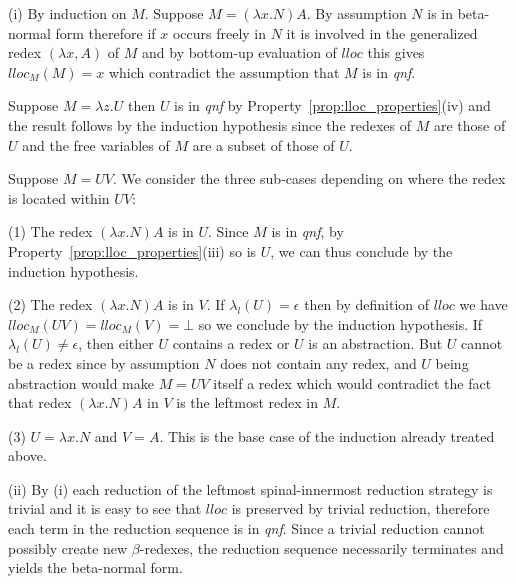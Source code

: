 \documentclass{elsarticle}
\theoremstyle{plain}
\theoremstyle{definition}
\theoremstyle{remark}
\begin{document}
\begin{compactitem}

\item[(i)]
By induction on $M$. Suppose $M = (\lambda x . N) A$. By assumption $N$ is in beta-normal form therefore if $x$ occurs freely in $N$ it is involved in the generalized redex $(\lambda x, A)$ of $M$ and by bottom-up evaluation of $lloc$ this gives $lloc_M(M) = x$ which contradict the assumption that $M$ is in \emph{qnf}.

Suppose $M = \lambda z . U$ then $U$ is in \emph{qnf} by Property~\ref{prop:lloc_properties}(iv) and the result follows by the induction hypothesis
since the redexes of $M$ are those of $U$ and the free variables of $M$ are a subset of those of $U$.

Suppose $M = U V$. We consider the three sub-cases depending on where the redex is located within $U V$:
\begin{compactitem}
  \item[(1)] The redex $(\lambda x . N) A$  is in $U$. Since $M$ is in \emph{qnf}, by Property~\ref{prop:lloc_properties}(iii) so is $U$, we can thus conclude by the induction hypothesis.

  \item[(2)] The redex $(\lambda x . N) A$  is in $V$.
If $\lambda_l(U) = \epsilon$ then by definition of $lloc$ we have $lloc_M(UV) = lloc_M(V) = \bot$ so we conclude by the induction hypothesis.
If $\lambda_l(U) \neq \epsilon$, then either $U$ contains a redex or $U$ is an abstraction. But $U$ cannot be a redex since by assumption $N$ does not contain any redex, and $U$ being abstraction would make $M = U V$ itself a redex which would contradict the fact that redex $(\lambda x . N) A$ in $V$ is the leftmost redex in $M$.

  \item[(3)] $U = \lambda x . N$ and $V = A$. This is the base case of the induction already treated above.
\end{compactitem}

\item[(ii)]
By (i) each reduction of the leftmost spinal-innermost reduction strategy is trivial and it is easy to see that $lloc$ is preserved by trivial reduction, therefore each term in the reduction sequence is in \emph{qnf}.
Since a trivial reduction cannot possibly create new $\beta$-redexes, the reduction sequence necessarily terminates and yields the beta-normal form.
\end{compactitem}
\end{document}
